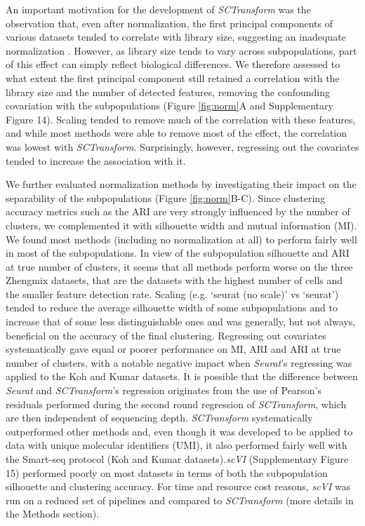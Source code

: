 \documentclass{bmcart}
\begin{document}
An important motivation for the development of \textit{SCTransform} was the observation that, even after normalization, the first principal components of various datasets tended to correlate with library size, suggesting an inadequate normalization \cite{hafemeisterSCtransform2019}. However, as library size tends to vary across subpopulations, part of this effect can simply reflect biological differences. We therefore assessed to what extent the first principal component still retained a correlation with the library size and the number of detected features, removing the confounding covariation with the subpopulations (Figure \ref{fig:norm}A and Supplementary Figure 14). Scaling tended to remove much of the correlation with these features, and while most methods were able to remove most of the effect, the correlation was lowest with \textit{SCTransform}. Surprisingly, however, regressing out the covariates tended to increase the association with it.

We further evaluated normalization methods by investigating their impact on the separability of the subpopulations (Figure \ref{fig:norm}B-C). Since clustering accuracy metrics such as the ARI are very strongly influenced by the number of clusters, we complemented it with silhouette width \cite{RousseeuwSil1987} and mutual information (MI). We found most methods (including no normalization at all) to perform fairly well in most of the subpopulations. In view of the subpopulation silhouette and ARI at true number of clusters, it seems that all methods perform worse on the three Zhengmix datasets, that are the datasets with the highest number of cells and the smaller feature detection rate. Scaling (e.g. `seurat (no scale)' vs `seurat') tended to reduce the average silhouette width of some subpopulations and to increase that of some less distinguishable ones and was generally, but not always, beneficial on the accuracy of the final clustering. Regressing out covariates systematically gave equal  or poorer performance on MI, ARI and ARI at true number of clusters, with a notable negative impact when \textit{Seurat}'s regressing was applied to the Koh and Kumar datasets. It is possible that the difference between \textit{Seurat} and \textit{SCTransform}'s regression originates from the use of Pearson's residuals performed during the second round regression of \textit{SCTransform}, which are then independent of sequencing depth. \textit{SCTransform} systematically outperformed other methods and, even though it was developed to be applied to data with unique molecular identifiers (UMI), it also performed fairly well with the Smart-seq protocol (Koh and Kumar datasets).\textit{scVI} (Supplementary Figure 15) performed poorly on most datasets in terms of both the subpopulation silhouette and clustering accuracy. For time and resource cost reasons, \textit{scVI} was run on a reduced set of pipelines and compared to \textit{SCTransform} (more details in the Methods section).
\end{document}
